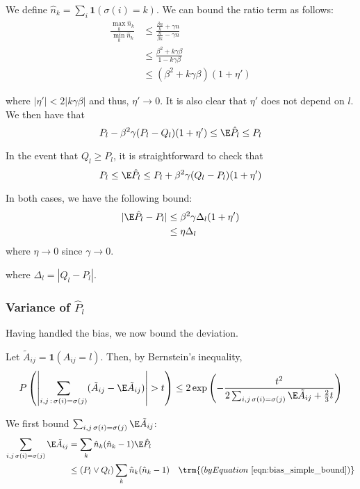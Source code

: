 \documentclass{article}
\begin{document}
We define $\hat{n}_k = \sum_i \mathbf{1}(\sigma(i) = k)$. We can bound the ratio term as follows:
\begin{align*}
\frac{\max_k \hat{n}_k}{\min_k \hat{n}_k} &\leq
   \frac{ \frac{\beta n}{k} + \gamma n}{\frac{n}{\beta k} - \gamma n} \\
  &\leq \frac{\beta^2 + k \gamma \beta}{1 - k \gamma \beta} \\
 &\leq (\beta^2 + k\gamma \beta) (1 + \eta') 
\end{align*}

where $|\eta'| < 2 | k \gamma \beta|$ and thus, $\eta' \rightarrow 0$. It is also clear that $\eta'$ does not depend on $l$. 
We then have that
\[
P_l - \beta^2 \gamma (P_l - Q_l) (1 + \eta')  \leq \E \hat{P}_l \leq P_l
\]

In the event that $Q_l \geq P_l$, it is straightforward to check that
\[
P_l \leq \E \hat{P}_l \leq P_l + \beta^2 \gamma (Q_l - P_l)(1+ \eta')
\]


In both cases, we have the following bound:
\begin{align*}
| \E \hat{P}_l - P_l | &\leq \beta^2 \gamma \Delta_l (1 + \eta')  \\
   &\leq \eta \Delta_l \\
\end{align*}
where $\eta \rightarrow 0$ since $\gamma \rightarrow 0$. 

where $\Delta_l  = |Q_l - P_l|$. 

\subsubsection{Variance of $\hat{P}_l$}

Having handled the bias, we now bound the deviation.

Let $ \tilde{A}_{ij} = \mathbf{1}(A_{ij} = l)$. Then, by Bernstein's inequality,
\[
P\left( \left| \sum_{i,j\,:\, \sigma(i) = \sigma(j)} (\tilde{A}_{ij} - \E \tilde{A}_{ij} ) \right|  > t 
 \right) \leq 2 \exp\left( 
    - \frac{t^2}{ 2 \sum_{i,j \, \sigma(i) = \sigma(j)} \E \tilde{A}_{ij}  + \frac{2}{3}t } 
\right)
\]

We first bound $\sum_{i,j \, \sigma(i) = \sigma(j)} \E \tilde{A}_{ij}$:
\begin{align*}
\sum_{i,j \, \sigma(i) = \sigma(j)} \E \tilde{A}_{ij} &=
  \sum_k \hat{n}_k (\hat{n}_k - 1) \E \hat{P}_l \\
 &\leq (P_l \vee Q_l) \sum_k \hat{n}_k (\hat{n}_k - 1) \quad 
  \trm{(by Equation~\ref{eqn:bias_simple_bound})}
\end{align*}
\end{document}
